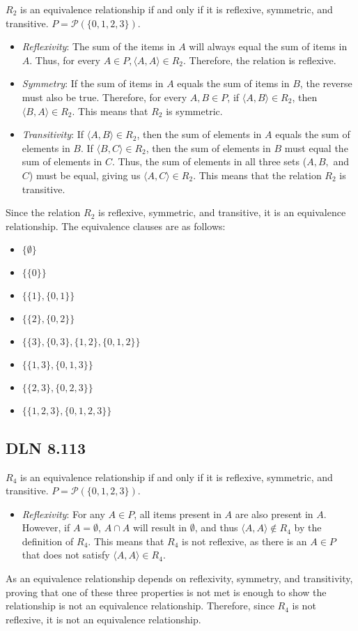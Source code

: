 \documentclass[titlepage]{article}
\begin{document}
$R_2$ is an equivalence relationship if and only if it is reflexive, symmetric, and transitive. $P = \mathcal{P}(\{0,1,2,3\})$. 
\begin{itemize}
\item \emph{Reflexivity}: The sum of the items in $A$ will always equal the sum of items in $A$. Thus, for every $A \in P, \langle A,A \rangle \in R_2$. Therefore, the relation is reflexive.
\item \emph{Symmetry}: If the sum of items in $A$ equals the sum of items in $B$, the reverse must also be true. Therefore, for every $A,B \in P$, if $\langle A,B \rangle \in R_2$, then $\langle B,A \rangle \in R_2$. This means that $R_2$ is symmetric. 
\item \emph{Transitivity}: If $\langle A,B \rangle \in R_2$, then the sum of elements in $A$ equals the sum of elements in $B$. If $\langle B,C \rangle \in R_2$, then the sum of elements in $B$ must equal the sum of elements in $C$. Thus, the sum of elements in all three sets ($A,B,$ and $C$) must be equal, giving us $\langle A,C \rangle \in R_2$. This means that the relation $R_2$ is transitive.
\end{itemize}
Since the relation $R_2$ is reflexive, symmetric, and transitive, it is an equivalence relationship. The equivalence clauses are as follows:
\begin{itemize}
\item $\{ \emptyset\} $
\item $\{ \{0\}\} $
\item $\{ \{1\}, \{0,1\}\} $
\item $\{ \{2\}, \{0,2\}\} $
\item $\{ \{3\}, \{0,3\}, \{1,2\}, \{0,1,2\}\} $
\item $\{ \{1,3\}, \{0,1,3\}\} $
\item $\{ \{2,3\}, \{0,2,3\}\} $
\item $\{ \{1,2,3\}, \{0,1,2,3\}\} $
\end{itemize}

\subsection{DLN 8.113} 

$R_4$ is an equivalence relationship if and only if it is reflexive, symmetric, and transitive. $P = \mathcal{P}(\{0,1,2,3\})$. 
\begin{itemize}
\item \emph{Reflexivity}: For any $A \in P$, all items present in $A$ are also present in $A$. However, if $A = \emptyset$, $A \cap A$ will result in $\emptyset$, and thus $\langle A,A\rangle \notin R_4$ by the definition of $R_4$. This means that $R_4$ is not reflexive, as there is an $A \in P$ that does not satisfy $\langle A,A\rangle \in R_4$.
\end{itemize}
As an equivalence relationship depends on reflexivity, symmetry, and transitivity, proving that one of these three properties is not met is enough to show the relationship is not an equivalence relationship. Therefore, since $R_4$ is not reflexive, it is not an equivalence relationship.
\end{document}
